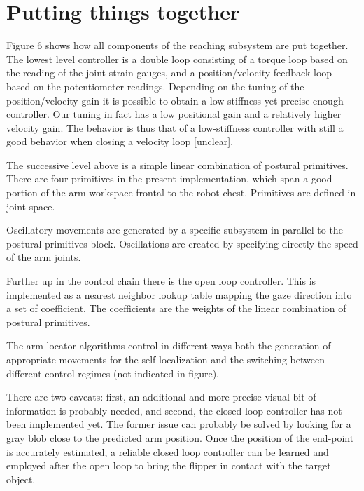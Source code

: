 \fi

\ifverbose
\section{Putting things together}

Figure 6 shows how all components of the reaching subsystem are put
together. The lowest level controller is a double loop consisting of a
torque loop based on the reading of the joint strain gauges, and a
position/velocity feedback loop based on the potentiometer readings.
Depending on the tuning of the position/velocity gain it is possible
to obtain a low stiffness yet precise enough controller. Our tuning in
fact has a low positional gain and a relatively higher velocity gain.
The behavior is thus that of a low-stiffness controller with still a
good behavior when closing a velocity loop [unclear].

The successive level above is a simple linear combination of postural
primitives. There are four primitives in the present implementation,
which span a good portion of the arm workspace frontal to the robot
chest. Primitives are defined in joint space.

Oscillatory movements are generated by a specific subsystem in
parallel to the postural primitives block. Oscillations are created by
specifying directly the speed of the arm joints.

Further up in the control chain there is the open loop controller.
This is implemented as a nearest neighbor lookup table mapping the
gaze direction into a set of coefficient. The coefficients are the
weights of the linear combination of postural primitives.

The arm locator algorithms control in different ways both the
generation of appropriate movements for the self-localization and the
switching between different control regimes (not indicated in figure).

There are two caveats: first, an additional and more precise visual
bit of information is probably needed, and second, the closed loop
controller has not been implemented yet. The former issue can probably
be solved by looking for a gray blob close to the predicted arm
position. Once the position of the end-point is accurately estimated,
a reliable closed loop controller can be learned and employed after the
open loop to bring the flipper in contact with the target object.
\fi

